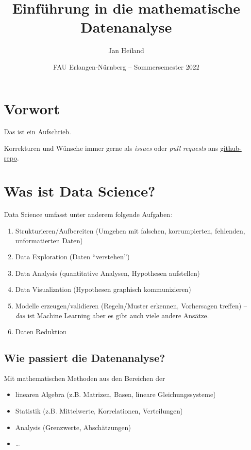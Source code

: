 \documentclass[]{book}
\title{Einführung in die mathematische Datenanalyse}
\author{Jan Heiland}
\institute{FAU Erlangen-Nürnberg}
\date{FAU Erlangen-Nürnberg -- Sommersemester 2022}
\providecommand{\tightlist}{%
  \setlength{\itemsep}{0pt}\setlength{\parskip}{0pt}}
\theoremstyle{definition}
\theoremstyle{definition}
\theoremstyle{definition}
\theoremstyle{definition}
\theoremstyle{remark}
\begin{document}
\maketitle

{
\hypersetup{linkcolor=}
\setcounter{tocdepth}{1}
\tableofcontents
}
\hypertarget{vorwort}{%
\chapter*{Vorwort}\label{vorwort}}

Das ist ein Aufschrieb.

Korrekturen und Wünsche immer gerne als \emph{issues} oder \emph{pull requests} ans \href{https://github.com/highlando/script-emds}{github-repo}.

\hypertarget{was-ist-data-science}{%
\chapter{Was ist Data Science?}\label{was-ist-data-science}}

Data Science umfasst unter anderem folgende Aufgaben:

\begin{enumerate}
\def\labelenumi{\arabic{enumi}.}
\item
  Strukturieren/Aufbereiten (Umgehen mit falschen, korrumpierten, fehlenden,
  unformatierten Daten)
\item
  Data Exploration (Daten ``verstehen'')
\item
  Data Analysis (quantitative Analysen, Hypothesen aufstellen)
\item
  Data Visualization (Hypothesen graphisch kommunizieren)
\item
  Modelle erzeugen/validieren (Regeln/Muster erkennen, Vorhersagen treffen) -- \emph{das} ist Machine Learning aber es gibt auch viele andere Ansätze.
\item
  Daten Reduktion
\end{enumerate}

\hypertarget{wie-passiert-die-datenanalyse}{%
\section{Wie passiert die Datenanalyse?}\label{wie-passiert-die-datenanalyse}}

Mit mathematischen Methoden aus den Bereichen der

\begin{itemize}
\tightlist
\item
  linearen Algebra (z.B. Matrizen, Basen, lineare Gleichungssysteme)
\item
  Statistik (z.B. Mittelwerte, Korrelationen, Verteilungen)
\item
  Analysis (Grenzwerte, Abschätzungen)
\item
  \ldots{}
\end{itemize}
\end{document}

